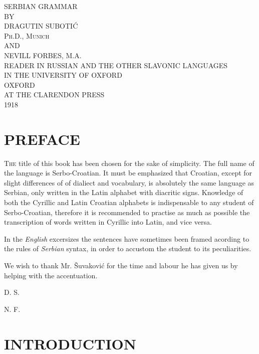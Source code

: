 \documentclass[11pt]{book}
\begin{document}
\begin{titlepage}
    \begin{center}
        {\Huge SERBIAN GRAMMAR}\\
        \vspace{0.5cm}
        BY\\
        \vspace{0.5cm}
        {\Large DRAGUTIN SUBOTIĆ}\\
        \textsc{Ph.D., Munich}\\
        \vspace{0.5cm}
        AND\\
        \vspace{0.5cm}
        {\Large NEVILL FORBES, M.A.}\\
        {\tiny READER IN RUSSIAN AND THE OTHER SLAVONIC LANGUAGES}\\
        {\tiny IN THE UNIVERSITY OF OXFORD}\\
        \vfill
        {\large OXFORD}\\
        {\large AT THE CLARENDON PRESS}\\
        {\large 1918}
    \end{center}
\end{titlepage}

\part*{\LARGE PREFACE}

{\large \textsc{The} title of this book has been chosen for the sake of simplicity. The
full name of the language is Serbo-Croatian. It must be emphasized that
Croatian, except for slight differences of of dialiect and vocabulary, is
absolutely the same language as Serbian, only written in the Latin alphabet
with diacritic signs. Knowledge of both the Cyrillic and Latin {Croatian}
alphabets is indispensable to any student of Serbo-Croatian, therefore it is
recommended to practise as much as possible the transcription of words written
in Cyrillic into Latin, and vice versa.

In the \textit{English} excersizes the sentences have sometimes been framed
acording to the rules of \textit{Serbian} syntax, in order to accustom the
student to its peculiarities.

We wish to thank Mr. \v{S}uvakovi\'{c} for the time and labour he has given us
by helping with the accentuation.}

\hfill D. S.\quad

\hfill N. F.\quad

\part*{INTRODUCTION}









\end{document}
